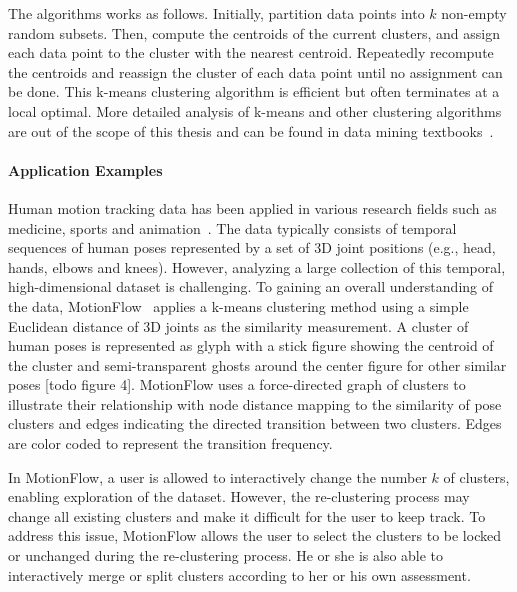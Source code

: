 The algorithms works as follows. Initially, partition data points into $k$ non-empty random subsets. Then, compute the centroids of the current clusters, and assign each data point to the cluster with the nearest centroid. Repeatedly recompute the centroids and reassign the cluster of each data point until no assignment can be done. This k-means clustering algorithm is efficient but often terminates at a local optimal. More detailed analysis of k-means and other clustering algorithms are out of the scope of this thesis and can be found in data mining textbooks~\cite{Tan2006,Han2011}.

\paragraph{Application Examples}
Human motion tracking data has been applied in various research fields such as medicine, sports and animation~\cite{Bernard2013}. The data typically consists of temporal sequences of human poses represented by a set of 3D joint positions (e.g., head, hands, elbows and knees). However, analyzing a large collection of this temporal, high-dimensional dataset is challenging. To gaining an overall understanding of the data, MotionFlow~\cite{Jang2016} applies a k-means clustering method using a simple Euclidean distance of 3D joints as the similarity measurement. A cluster of human poses is represented as glyph with a stick figure showing the centroid of the cluster and semi-transparent ghosts around the center figure for other similar poses [todo figure 4]. MotionFlow uses a force-directed graph of clusters to illustrate their relationship with node distance mapping to the similarity of pose clusters and edges indicating the directed transition between two clusters. Edges are color coded to represent the transition frequency.

In MotionFlow, a user is allowed to interactively change the number $k$ of clusters, enabling exploration of the dataset. However, the re-clustering process may change all existing clusters and make it difficult for the user to keep track. To address this issue, MotionFlow allows the user to select the clusters to be locked or unchanged during the re-clustering process. He or she is also able to interactively merge or split clusters according to her or his own assessment.

